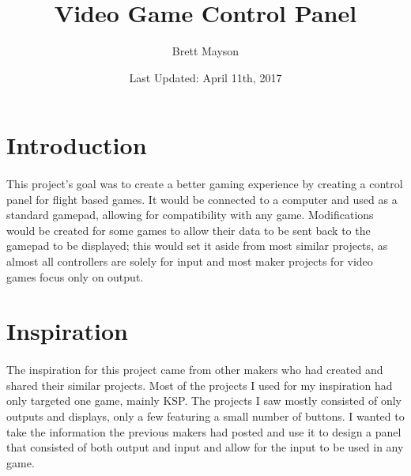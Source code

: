 \documentclass[12pt,a4paper]{article}
\title{Video Game Control Panel}
\date{Last Updated: April 11th, 2017}
\author{Brett Mayson}
\begin{document}

\maketitle
\newpage
\tableofcontents
\newpage
\listoffigures
\printglossary[type=\acronymtype]
\newpage
{}

\linespread{1.5}

\section{Introduction}
\paragraph{}
This project's goal was to create a better gaming experience by creating a control panel for flight based games. It would be connected to a computer and used as a standard gamepad, allowing for compatibility with any game. Modifications would be created for some games to allow their data to be sent back to the gamepad to be displayed; this would set it aside from most similar projects, as almost all controllers are solely for input and most maker projects for video games focus only on output.
\section{Inspiration}
\paragraph{}
The inspiration for this project came from other makers who had created and shared their similar projects. Most of the projects I used for my inspiration had only targeted one game, mainly \gls{KSP}. The projects I saw mostly consisted of only outputs and displays, only a few featuring a small number of buttons. I wanted to take the information the previous makers had posted and use it to design a panel that consisted of both output and input and allow for the input to be used in any game.
\end{document}
